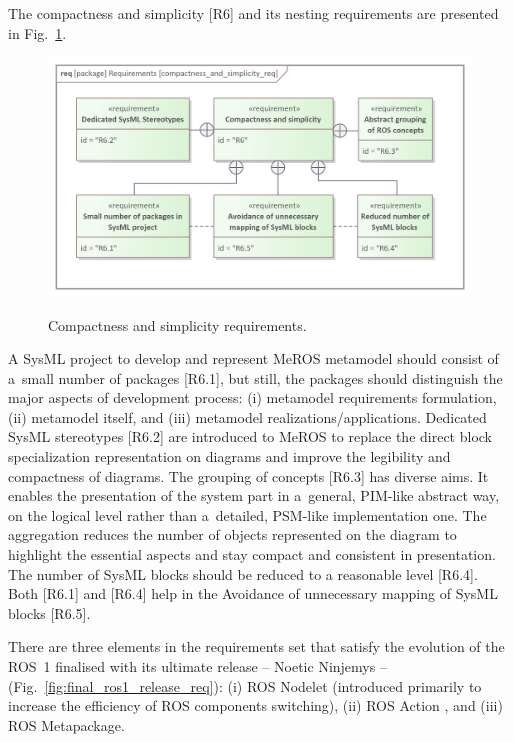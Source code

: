 \documentclass[11pt,oneside,a4paper]{article}
\begin{document}
		\pagebreak
		
	The compactness and simplicity [R6] and its nesting requirements are presented in Fig.~\ref{fig:compactness_and_simplicity_req}. 
	
	\begin{figure}[H]
		\centering
		\begin{center}
			{\includegraphics[scale=1.0]{img/requirement_pkg/compactness_and_simplicity_req.png}}
		\end{center}
		\caption{Compactness and simplicity requirements.} 
		\label{fig:compactness_and_simplicity_req}
	\end{figure}
	
	A SysML project to develop and represent MeROS metamodel should consist of a~small number of packages [R6.1], but still, the packages should distinguish the major aspects of development process: (i) metamodel requirements formulation, (ii) metamodel itself, and (iii) metamodel realizations/applications.
	Dedicated SysML stereotypes [R6.2] are introduced to MeROS to replace the direct block specialization representation on diagrams and improve the legibility and compactness of diagrams.
	The grouping of concepts [R6.3] has diverse aims. It enables the presentation of the system part in a~general, PIM-like abstract way, on the logical level rather than a~detailed, PSM-like implementation one. The aggregation reduces the number of objects represented on the diagram to highlight the essential aspects and stay compact and consistent in presentation.
	The number of SysML blocks should be reduced to a reasonable level [R6.4]. Both [R6.1] and [R6.4] help in the Avoidance of unnecessary mapping of SysML blocks [R6.5].

\pagebreak

	There are three elements in the requirements set that satisfy the evolution of the ROS~1  finalised with its ultimate release -- Noetic Ninjemys -- (Fig.~\ref{fig:final_ros1_release_req}): (i) ROS Nodelet  (introduced primarily to increase the efficiency of ROS components switching), (ii) ROS Action , and (iii) ROS Metapackage.
	
\end{document}
